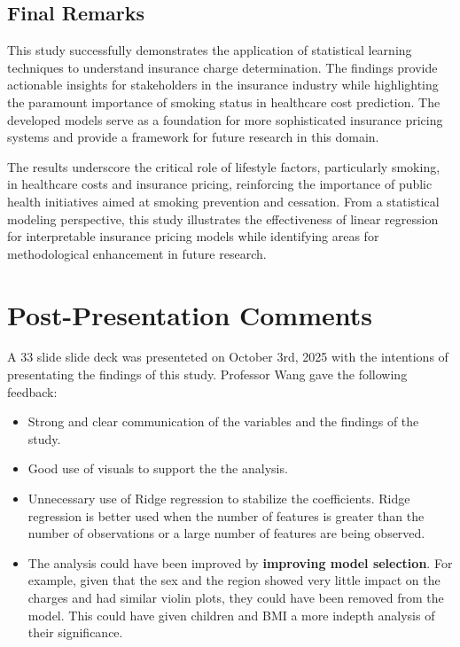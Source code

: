 \documentclass[12pt,a4paper]{article}
\begin{document}
\subsection{Final Remarks}

This study successfully demonstrates the application of statistical learning techniques to understand insurance charge determination. The findings provide actionable insights for stakeholders in the insurance industry while highlighting the paramount importance of smoking status in healthcare cost prediction. The developed models serve as a foundation for more sophisticated insurance pricing systems and provide a framework for future research in this domain.

The results underscore the critical role of lifestyle factors, particularly smoking, in healthcare costs and insurance pricing, reinforcing the importance of public health initiatives aimed at smoking prevention and cessation. From a statistical modeling perspective, this study illustrates the effectiveness of linear regression for interpretable insurance pricing models while identifying areas for methodological enhancement in future research.

\section{Post-Presentation Comments}

    A 33 slide slide deck was presenteted on October 3rd, 2025 with the intentions of presentating the findings of this study. Professor Wang gave the following feedback:
\begin{itemize}   
    \item{Strong and clear communication of the variables and the findings of the study.}
    \item{Good use of visuals to support the the analysis.}
    \item{Unnecessary use of Ridge regression to stabilize the coefficients. Ridge regression is better used when the number of features is greater than the number of observations or a large number of features are being observed.}
    \item{The analysis could have been improved by \textbf{improving model selection}. For example, given that the sex and the region showed very little impact on the charges and had similar violin plots, they could have been removed from the model. This could have given children and BMI a more indepth analysis of their significance.}
\end{itemize}
\end{document}
